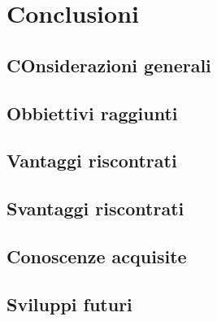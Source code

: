 
\chapter{Conclusioni}
\label{cap:conclusioni}

\section{COnsiderazioni generali}


\section{Obbiettivi raggiunti}

\section{Vantaggi riscontrati}

\section{Svantaggi riscontrati}

\section{Conoscenze acquisite}

\section{Sviluppi futuri}